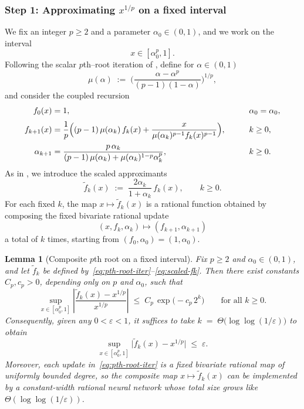 \documentclass{article}
\theoremstyle{plain}
\newtheorem{lemma}[theorem]{Lemma}
\theoremstyle{definition}
\theoremstyle{remark}
\begin{document}
\subsubsection*{Step 1: Approximating $x^{1/p}$ on a fixed interval}

We fix an integer $p\ge 2$ and a parameter $\alpha_0\in(0,1)$, and we work on the interval
\[
x \in [\alpha_0^p,1].
\]
Following the scalar $p$th–root iteration of \citet[Sec.~2]{GAWLIK2021105577}, define for $\alpha\in(0,1)$
\begin{equation}
\label{eq:mu-def}
\mu(\alpha)
\;:=\;
\biggl(
  \frac{\alpha - \alpha^p}{(p-1)(1-\alpha)}
\biggr)^{1/p},
\end{equation}
and consider the coupled recursion
\begin{equation}
\label{eq:pth-root-iter}
\begin{aligned}
f_{0}(x) &= 1,\qquad &&\alpha_{0} = \alpha_0,\\[0.25em]
f_{k+1}(x)
&=
\frac{1}{p}\Bigl(
    (p-1)\,\mu(\alpha_k)\,f_k(x)
    +
    \frac{x}{\mu(\alpha_k)^{p-1} f_k(x)^{p-1}}
\Bigr),
\qquad &&k\ge 0,\\[0.25em]
\alpha_{k+1}
&=
\frac{p\,\alpha_k}{
  (p-1)\,\mu(\alpha_k)
  +
  \mu(\alpha_k)^{1-p}\alpha_k^{p}
},
\qquad &&k\ge 0.
\end{aligned}
\end{equation}
As in \citet[Sec.~2]{GAWLIK2021105577}, we introduce the scaled approximants
\begin{equation}
\label{eq:scaled-fk}
\tilde f_k(x)
\;:=\;
\frac{2\alpha_k}{1+\alpha_k}\,f_k(x),
\qquad k\ge 0.
\end{equation}
For each fixed $k$, the map $x\mapsto \tilde f_k(x)$ is a rational function obtained by composing the fixed bivariate rational update
\[
(x,f_k,\alpha_k)\longmapsto(f_{k+1},\alpha_{k+1})
\]
a total of $k$ times, starting from $(f_0,\alpha_0)=(1,\alpha_0)$.

\begin{lemma}[Composite $p$th root on a fixed interval]
\label{lem:pth-root}
Fix $p\ge 2$ and $\alpha_0\in(0,1)$, and let $\tilde f_k$ be defined by~\cref{eq:pth-root-iter}–\cref{eq:scaled-fk}. Then there exist constants $C_p,c_p>0$, depending only on $p$ and $\alpha_0$, such that
\begin{equation}
\label{eq:pth-root-rel-error}
\sup_{x\in[\alpha_0^p,1]}
\left|
\frac{\tilde f_k(x)-x^{1/p}}{x^{1/p}}
\right|
\;\le\;
C_p\,\exp\!\bigl(-c_p\,2^k\bigr)
\qquad\text{for all }k\ge 0.
\end{equation}
Consequently, given any $0<\varepsilon<1$, it suffices to take \(
k \;=\; \Theta\!\bigl(\log\log(1/\varepsilon)\bigr)
\) to obtain
\[
\sup_{x\in[\alpha_0^p,1]}
\bigl|\tilde f_k(x)-x^{1/p}\bigr|
\;\le\;\varepsilon.
\]
Moreover, each update in~\cref{eq:pth-root-iter} is a fixed bivariate rational map of uniformly bounded degree, so the composite map $x\mapsto \tilde f_k(x)$ can be implemented by a constant-width rational neural network whose total size grows like $\Theta(\log\log(1/\varepsilon))$.
\end{lemma}
\end{document}
